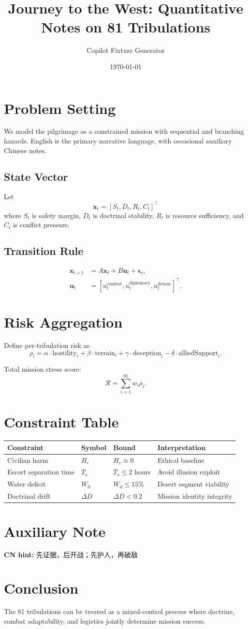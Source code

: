 \documentclass{article}
\title{Journey to the West: Quantitative Notes on 81 Tribulations}
\author{Copilot Fixture Generator}
\date{\today}
\begin{document}
\maketitle

\section{Problem Setting}
We model the pilgrimage as a constrained mission with sequential and branching hazards.
English is the primary narrative language, with occasional auxiliary Chinese notes.

\subsection{State Vector}
Let
\[
\mathbf{x}_t = [S_t, D_t, R_t, C_t]^\top
\]
where $S_t$ is safety margin, $D_t$ is doctrinal stability,
$R_t$ is resource sufficiency, and $C_t$ is conflict pressure.

\subsection{Transition Rule}
\begin{align}
\mathbf{x}_{t+1} &= A\mathbf{x}_t + B\mathbf{u}_t + \boldsymbol{\epsilon}_t, \\
\mathbf{u}_t &= [u_t^{\text{combat}}, u_t^{\text{diplomacy}}, u_t^{\text{detour}}]^\top.
\end{align}

\section{Risk Aggregation}
Define per-tribulation risk as
\[
\rho_i = \alpha \cdot \text{hostility}_i + \beta \cdot \text{terrain}_i + \gamma \cdot \text{deception}_i - \delta \cdot \text{alliedSupport}_i.
\]

Total mission stress score:
\[
\mathcal{R} = \sum_{i=1}^{81} w_i \rho_i.
\]

\section{Constraint Table}
\begin{longtable}{llll}
\toprule
Constraint & Symbol & Bound & Interpretation \\
\midrule
\endhead
Civilian harm & $H_c$ & $H_c \approx 0$ & Ethical baseline \\
Escort separation time & $T_s$ & $T_s \le 2$ hours & Avoid illusion exploit \\
Water deficit & $W_d$ & $W_d \le 15\%$ & Desert segment viability \\
Doctrinal drift & $\Delta D$ & $\Delta D < 0.2$ & Mission identity integrity \\
\bottomrule
\end{longtable}

\section{Auxiliary Note}
\textbf{CN hint:} 先证据，后开战；先护人，再破敌

\section{Conclusion}
The 81 tribulations can be treated as a mixed-control process where doctrine,
combat adaptability, and logistics jointly determine mission success.
\end{document}
